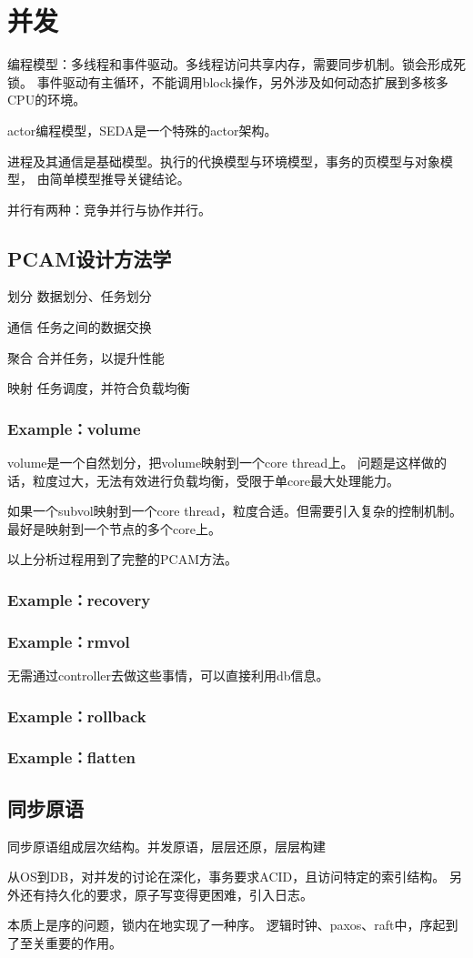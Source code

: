 \chapter{并发}

编程模型：多线程和事件驱动。多线程访问共享内存，需要同步机制。锁会形成死锁。
事件驱动有主循环，不能调用block操作，另外涉及如何动态扩展到多核多CPU的环境。

actor编程模型，SEDA是一个特殊的actor架构。

进程及其通信是基础模型。执行的代换模型与环境模型，事务的页模型与对象模型，
由简单模型推导关键结论。

并行有两种：竞争并行与协作并行。

\section{PCAM设计方法学}

\begin{enumbox}
\item 划分 数据划分、任务划分
\item 通信 任务之间的数据交换
\item 聚合 合并任务，以提升性能
\item 映射 任务调度，并符合负载均衡
\end{enumbox}

\subsection{Example：volume}

volume是一个自然划分，把volume映射到一个core thread上。
问题是这样做的话，粒度过大，无法有效进行负载均衡，受限于单core最大处理能力。

如果一个subvol映射到一个core thread，粒度合适。但需要引入复杂的控制机制。
最好是映射到一个节点的多个core上。

以上分析过程用到了完整的PCAM方法。

\subsection{Example：recovery}

\subsection{Example：rmvol}

无需通过controller去做这些事情，可以直接利用db信息。

\subsection{Example：rollback}

\subsection{Example：flatten}

\section{同步原语}

同步原语组成层次结构。并发原语，层层还原，层层构建

从OS到DB，对并发的讨论在深化，事务要求ACID，且访问特定的索引结构。
另外还有持久化的要求，原子写变得更困难，引入日志。

本质上是序的问题，锁内在地实现了一种序。
逻辑时钟、paxos、raft中，序起到了至关重要的作用。
